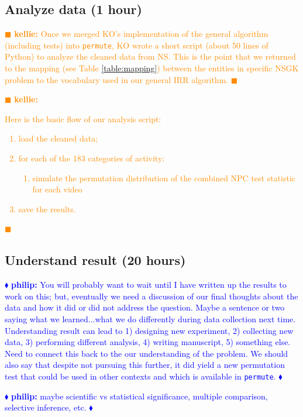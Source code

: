 \documentclass[]{article}
\newcommand{\philip}[1] { \textcolor{blue} {
\ensuremath{\blacklozenge} {\bf philip:}  {#1}
\ensuremath{\blacklozenge} } }
\newcommand{\kellie}[1] { \textcolor{darkorange} {
\ensuremath{\blacksquare} {\bf kellie:}  {#1}
\ensuremath{\blacksquare} } }
\begin{document}
\subsection{Analyze data (1 hour)}


\kellie{
Once we merged KO's implementation of the general algorithm (including tests)
into \texttt{permute}, KO wrote a short script (about 50 lines of Python) to
analyze the cleaned data from NS.
This is the point that we returned to the mapping (see Table
\ref{table:mapping}) between the entities in specific NSGK problem to the
vocabulary used in our general IRR algorithm.
}

\kellie{
Here is the basic flow of our analysis script:
\begin{enumerate}
\item load the cleaned data;
\item for each of the 183 categories of activity:
  \begin{enumerate}
    \item simulate the permutation distribution of the combined
       NPC test statistic for each video
  \end{enumerate}
\item save the results.
\end{enumerate}
}

\subsection{Understand result (20 hours)}\label{subsec:understand-result}

\philip{You will probably want to wait until I have written up the results to
work on this; but, eventually we need a discussion of our final thoughts about
the data and how it did or did not address the question.  Maybe a sentence or
two saying what we learned...what we do differently during data collection next
time.  Understanding result can lead to 1) designing new experiment, 2)
collecting new data, 3) performing different analysis, 4) writing manuscript,
5) something else.  Need to connect this back to the our understanding of the
problem.  We should also say that despite not pursuing this further, it did
yield a new permutation test that could be used in other contexts and which is
available in \texttt{permute}.  }

\philip{
maybe scientific vs statistical significance, multiple comparison, selective
inference, etc.
}
\end{document}
